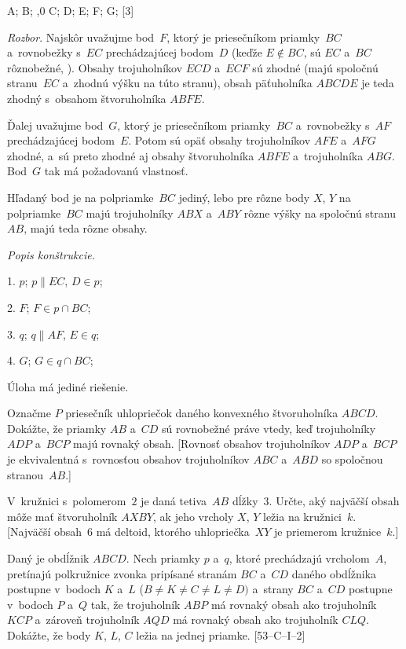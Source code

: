 {%
\fontplace
\rpoint A; \tpoint B; \rtpoint{},0 C;
\bpoint D; \bpoint E; \rtpoint F; \tpoint G;
[3] \hfil\Obr

{\it Rozbor}. Najskôr uvažujme bod~$F$, ktorý je priesečníkom priamky~$BC$ a~rovnobežky s~$EC$ prechádzajúcej bodom~$D$ (keďže $E\notin BC$, sú $EC$ a~$BC$ rôznobežné, \obr). Obsahy trojuholníkov $ECD$ a~$ECF$ sú zhodné (majú spoločnú stranu~$EC$ a~zhodnú výšku na túto stranu), obsah päťuholníka $ABCDE$ je teda zhodný s~obsahom štvoruholníka $ABFE$.
\inspicture{}

Ďalej uvažujme bod~$G$, ktorý je priesečníkom priamky~$BC$ a~rovnobežky s~$AF$ prechádzajúcej bodom~$E$. Potom sú opäť obsahy trojuholníkov $AFE$ a~$AFG$ zhodné, a~sú preto zhodné aj obsahy štvoruholníka $ABFE$ a~trojuholníka $ABG$. Bod~$G$ tak má požadovanú vlastnosť.

Hľadaný bod je na polpriamke~$BC$ jediný, lebo pre rôzne body $X$, $Y$ na polpriamke~$BC$ majú trojuholníky $ABX$ a~$ABY$ rôzne výšky na spoločnú stranu~$AB$, majú teda rôzne obsahy.

{\it Popis konštrukcie.}

1. $p$; $p\parallel EC$, $D\in p$;

2. $F$; $F\in p\cap BC$;

3. $q$; $q\parallel AF$, $E\in q$;

4. $G$; $G\in q\cap BC$;

Úloha má jediné riešenie.

Označme $P$ priesečník uhlopriečok daného konvexného štvoruholníka $ABCD$. Dokážte, že priamky $AB$ a~$CD$ sú rovnobežné práve vtedy, keď trojuholníky $ADP$ a~$BCP$ majú rovnaký obsah. [Rovnosť obsahov trojuholníkov $ADP$ a~$BCP$ je ekvivalentná s~rovnosťou obsahov trojuholníkov $ABC$ a~$ABD$ so spoločnou stranou~$AB$.]

V~kružnici s~polomerom~$2$ je daná tetiva~$AB$ dĺžky~$3$. Určte, aký najväčší obsah môže mať štvoruholník $AXBY$, ak jeho vrcholy $X$, $Y$ ležia na kružnici~$k$. [Najväčší obsah~$6$ má deltoid, ktorého uhlopriečka~$XY$ je priemerom kružnice~$k$.]

\D
Daný je obdĺžnik $ABCD$. Nech priamky $p$ a~$q$, ktoré prechádzajú vrcholom~$A$, pretínajú polkružnice zvonka pripísané stranám $BC$ a~$CD$ daného obdĺžnika postupne v~bodoch $K$ a~$L$ ($B\ne K\ne C\ne L\ne D)$ a~strany $BC$ a~$CD$ postupne v~bodoch $P$ a~$Q$ tak, že trojuholník $ABP$ má rovnaký obsah ako trojuholník $KCP$ a~zároveň trojuholník $AQD$ má rovnaký obsah ako trojuholník $CLQ$. Dokážte, že body $K$, $L$, $C$ ležia na jednej priamke. [53--C--I--2]
}

